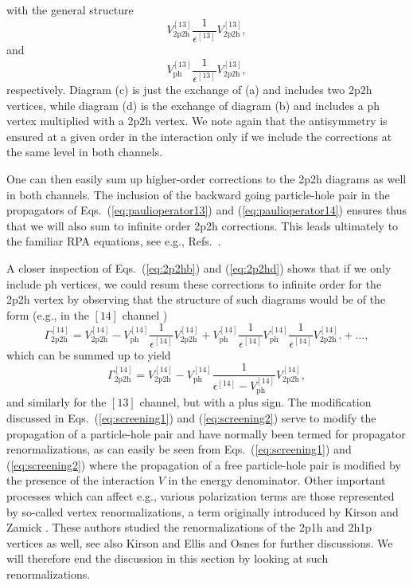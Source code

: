with the general structure
\begin{equation}
    V_{\mathrm{2p2h}}^{[13]}
     \frac{1}{\epsilon^{[13]}}
     V_{\mathrm{2p2h}}^{[13]},
\end{equation}
and
\begin{equation}
    V_{\mathrm{ph}}^{[13]}
     \frac{1}{\epsilon^{[13]}}
     V_{\mathrm{2p2h}}^{[13]},
\end{equation}
respectively. Diagram (c) is just the exchange of (a)
and includes two 2p2h vertices, while diagram (d) is the exchange
of diagram (b) and includes a ph vertex multiplied with
a 2p2h vertex. We note again that the antisymmetry is
ensured at a given order in the interaction only
if we include the corrections at the same level in both
channels.

One can then easily sum up higher-order corrections 
to the 2p2h diagrams as well in both channels.
The inclusion of the backward going particle-hole
pair in the propagators of Eqs.\ (\ref{eq:paulioperator13})
and (\ref{eq:paulioperator14}) ensures thus that we will
also sum to infinite order 2p2h corrections.
This leads ultimately to the familiar RPA equations,
see e.g., Refs.\ \cite{eo77,kt94}.  

A closer inspection of Eqs.\ (\ref{eq:2p2hb}) and
(\ref{eq:2p2hd}) shows that if we only include ph vertices,
we could resum these corrections to infinite
order for the 2p2h vertex by observing that the 
structure of such diagrams would be of the form
(e.g., in the $[14]$ channel )
\begin{equation}
       \Gamma_{\mathrm{2p2h}}^{[14]}=V^{[14]}_{\mathrm{2p2h}}-
        V^{[14]}_{\mathrm{ph}}
        \frac{1}{\epsilon^{[14]}}
        V_{\mathrm{2p2h}}^{[14]}+
        V^{[14]}_{\mathrm{ph}}
        \frac{1}{\epsilon^{[14]}}
        V^{[14]}_{\mathrm{ph}}
        \frac{1}{\epsilon^{[14]}}
        V^{[14]}_{\mathrm{2p2h}}.
             +\dots,
\end{equation}
which can be summed up to yield 
\begin{equation}
  \Gamma^{[14]}_{\mathrm{2p2h}}=V^{[14]}_{\mathrm{2p2h}}-
   V^{[14]}_{\mathrm{ph}}
   \frac{1}
   {\epsilon^{[14]}-V^{[14]}_{\mathrm{ph}}}
   V^{[14]}_{\mathrm{2p2h}},
   \label{eq:screening2}
\end{equation}
and similarly for the $[13]$ channel, but with a plus sign.
The modification discussed in Eqs.\ (\ref{eq:screening1})
and (\ref{eq:screening2})
serve to modify the propagation of a particle-hole pair
and have normally been termed for propagator
renormalizations, as can easily be seen from 
Eqs.\ (\ref{eq:screening1})
and (\ref{eq:screening2}) where the propagation of 
a free particle-hole pair is modified by the presence 
of the interaction $V$ in the energy denominator.
Other important processes which can affect e.g.,
various polarization terms are those 
represented by so-called vertex renormalizations,
a term originally introduced by Kirson and Zamick \cite{kz70}.
These authors studied the renormalizations of the 
2p1h and 2h1p vertices as well, see also Kirson \cite{kirson74}
and Ellis and Osnes \cite{eo77} for further discussions.
We will therefore end the discussion in this section
by looking at such renormalizations.

